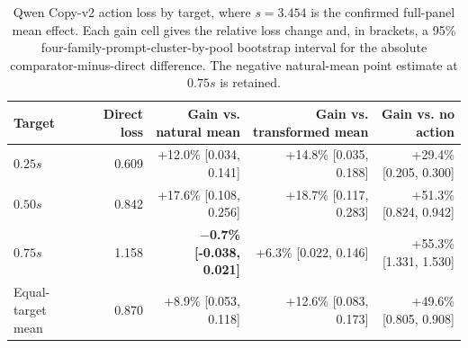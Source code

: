 \begin{table}[H]
\centering
\scriptsize
\setlength{\tabcolsep}{4pt}
\begin{tabular}{@{}lrrrr@{}}
\toprule
Target & Direct loss & Gain vs. natural mean & Gain vs. transformed mean & Gain vs. no action \\
\midrule
$0.25s$ & 0.609 & +12.0\% [0.034, 0.141] & +14.8\% [0.035, 0.188] & +29.4\% [0.205, 0.300] \\
$0.50s$ & 0.842 & +17.6\% [0.108, 0.256] & +18.7\% [0.117, 0.283] & +51.3\% [0.824, 0.942] \\
$0.75s$ & 1.158 & \textbf{$-$0.7\% [-0.038, 0.021]} & +6.3\% [0.022, 0.146] & +55.3\% [1.331, 1.530] \\
Equal-target mean & 0.870 & +8.9\% [0.053, 0.118] & +12.6\% [0.083, 0.173] & +49.6\% [0.805, 0.908] \\
\bottomrule
\end{tabular}
\caption{Qwen Copy-v2 action loss by target, where $s=3.454$ is the confirmed
full-panel mean effect. Each gain cell gives the relative loss change and, in
brackets, a 95\% four-family-prompt-cluster-by-pool bootstrap interval for the
absolute comparator-minus-direct difference. The negative natural-mean point
estimate at $0.75s$ is retained.}
\label{tab:qwen-per-target}
\end{table}

